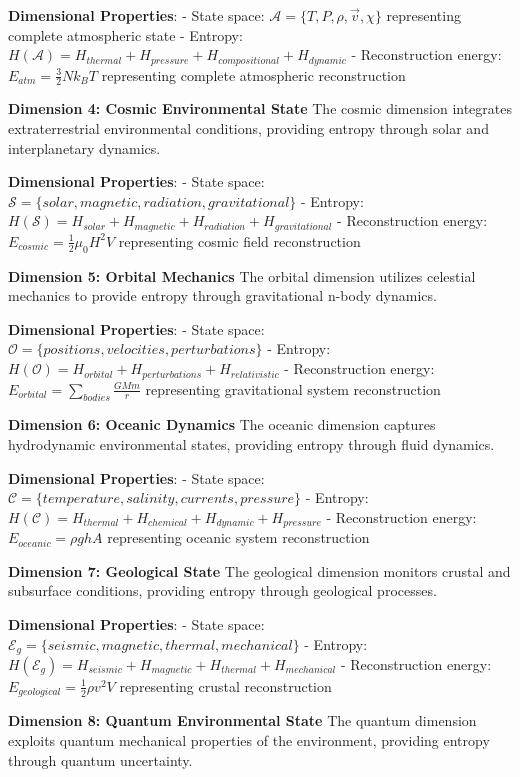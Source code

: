 \documentclass[12pt]{article}
\begin{document}
\textbf{Dimensional Properties}:
- State space: $\mathcal{A} = \{T, P, \rho, \vec{v}, \chi\}$ representing complete atmospheric state
- Entropy: $H(\mathcal{A}) = H_{thermal} + H_{pressure} + H_{compositional} + H_{dynamic}$
- Reconstruction energy: $E_{atm} = \frac{3}{2}Nk_B T$ representing complete atmospheric reconstruction

\textbf{Dimension 4: Cosmic Environmental State}
The cosmic dimension integrates extraterrestrial environmental conditions, providing entropy through solar and interplanetary dynamics.

\textbf{Dimensional Properties}:
- State space: $\mathcal{S} = \{solar, magnetic, radiation, gravitational\}$
- Entropy: $H(\mathcal{S}) = H_{solar} + H_{magnetic} + H_{radiation} + H_{gravitational}$
- Reconstruction energy: $E_{cosmic} = \frac{1}{2}\mu_0 H^2 V$ representing cosmic field reconstruction

\textbf{Dimension 5: Orbital Mechanics}
The orbital dimension utilizes celestial mechanics to provide entropy through gravitational n-body dynamics.

\textbf{Dimensional Properties}:
- State space: $\mathcal{O} = \{positions, velocities, perturbations\}$
- Entropy: $H(\mathcal{O}) = H_{orbital} + H_{perturbations} + H_{relativistic}$
- Reconstruction energy: $E_{orbital} = \sum_{bodies} \frac{GMm}{r}$ representing gravitational system reconstruction

\textbf{Dimension 6: Oceanic Dynamics}
The oceanic dimension captures hydrodynamic environmental states, providing entropy through fluid dynamics.

\textbf{Dimensional Properties}:
- State space: $\mathcal{C} = \{temperature, salinity, currents, pressure\}$
- Entropy: $H(\mathcal{C}) = H_{thermal} + H_{chemical} + H_{dynamic} + H_{pressure}$
- Reconstruction energy: $E_{oceanic} = \rho gh A$ representing oceanic system reconstruction

\textbf{Dimension 7: Geological State}
The geological dimension monitors crustal and subsurface conditions, providing entropy through geological processes.

\textbf{Dimensional Properties}:
- State space: $\mathcal{E}_g = \{seismic, magnetic, thermal, mechanical\}$
- Entropy: $H(\mathcal{E}_g) = H_{seismic} + H_{magnetic} + H_{thermal} + H_{mechanical}$
- Reconstruction energy: $E_{geological} = \frac{1}{2}\rho v^2 V$ representing crustal reconstruction

\textbf{Dimension 8: Quantum Environmental State}
The quantum dimension exploits quantum mechanical properties of the environment, providing entropy through quantum uncertainty.
\end{document}
